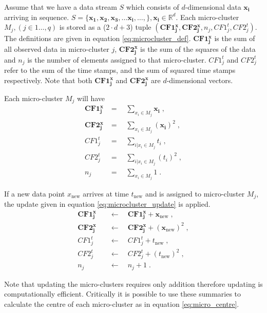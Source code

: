 Assume that we have a data stream $S$ which consists of $d$-dimensional data $\boldsymbol{x_i}$ arriving in sequence. $S = \{\boldsymbol{ x_1}, \boldsymbol{x_2}, \boldsymbol{x_3}, \hdots \boldsymbol{x_i}, \hdots, \}, \boldsymbol{x_i} \in \mathbb{R}^d$. Each micro-cluster $M_j, (j \in 1 \ldots, q)$ is stored as a ($2 \cdot d + 3$) tuple $(\boldsymbol{CF1^x_j}, \boldsymbol{CF2^x_j}, n_j, CF1^t_j, CF2^t_j)$. The definitions are given in equation \eqref{eq:microcluster_def}. $\boldsymbol{CF1^x_j}$ is the sum of all observed data in micro-cluster $j$, $\boldsymbol{CF2^x_j}$ is the sum of the squares of the data and $n_j$ is the number of elements assigned to that micro-cluster. $CF1^t_j$ and $CF2^t_j$ refer to the sum of the time stamps, and the sum of squared time stamps respectively. Note that both $\boldsymbol{CF1^x_j}$ and $\boldsymbol{CF2^x_j}$ are $d$-dimensional vectors.

Each micro-cluster $M_j$ will have 
\begin{align}
\boldsymbol{CF1^x_j} &= \quad \sum_{x_i \in M_j}{\boldsymbol{x_i}} \; , \nonumber  \\ 
\boldsymbol{CF2^x_j} &= \quad \sum_{x_i \in M_j}{(\boldsymbol{x_i})^2} \; , \nonumber\\
CF1^t_j &= \quad \sum_{i | x_i \in M_j}{t_i} \; , \nonumber   \\
CF2^t_j &= \quad\sum_{i | x_i \in M_j}{(t_i)^2} \; , \nonumber\\
n_j &= \quad \sum_{x_i \in M_j}{1} \; .
\label{eq:microcluster_def}
\end{align}

If a new data point $x_{\text{new}}$ arrives at time $t_{\text{new}}$ and is assigned to micro-cluster $M_j$, the  update  given in equation \eqref{eq:microcluster_update} is applied. 
\begin{align}
\boldsymbol{CF1^x_j} \quad &\leftarrow \quad \boldsymbol{CF1^x_j} + \boldsymbol{x}_{\text{new}} \; , \nonumber  \\ 
\boldsymbol{CF2^x_j} \quad &\leftarrow \quad \boldsymbol{CF2^x_j} + (\boldsymbol{x}_{\text{new}})^2 \; , \nonumber\\
CF1^t_j \quad &\leftarrow \quad  CF1^t_j + t_{\text{new}} \; , \nonumber   \\
CF2^t_j \quad &\leftarrow \quad CF2^t_j + (t_{\text{new}})^2 \; , \nonumber\\
n_j  \quad &\leftarrow \quad n_j + 1 \; .
\label{eq:microcluster_update}
\end{align}

Note that updating the micro-clusters requires only addition therefore updating is computationally efficient. Critically it is possible to use these summaries to calculate the centre of each micro-cluster as in equation \eqref{eq:micro_centre}. 

